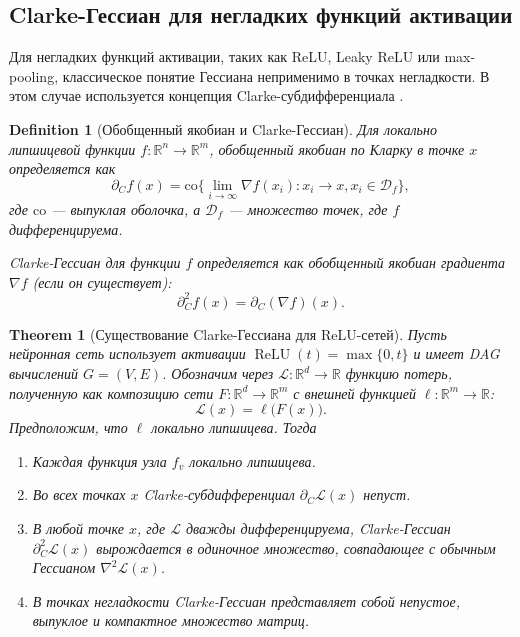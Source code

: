 \documentclass[11pt]{article}
\newtheorem{theorem}{Theorem}
\newtheorem{definition}{Definition}
\begin{document}
\subsection{Clarke-Гессиан для негладких функций активации}

Для негладких функций активации, таких как ReLU, Leaky ReLU или max-pooling, классическое понятие Гессиана
неприменимо в точках негладкости. В этом случае используется концепция Clarke-субдифференциала
\citep{clarke1990optimization}.

\begin{definition}[Обобщенный якобиан и Clarke-Гессиан]
  Для локально липшицевой функции $f: \mathbb{R}^n \to \mathbb{R}^m$, обобщенный якобиан по Кларку в точке
  $x$ определяется как
  \[
    \partial_C f(x) = \mathrm{co}\{\lim_{i\to\infty} \nabla f(x_i) : x_i \to x, x_i \in \mathcal{D}_f\},
  \]
  где $\mathrm{co}$ — выпуклая оболочка, а $\mathcal{D}_f$ — множество точек, где $f$ дифференцируема.

  Clarke-Гессиан для функции $f$ определяется как обобщенный якобиан градиента $\nabla f$ (если он существует):
  \[
    \partial_C^2 f(x) = \partial_C(\nabla f)(x).
  \]
\end{definition}

\begin{theorem}[Существование Clarke-Гессиана для ReLU-сетей]
Пусть нейронная сеть использует активации $\operatorname{ReLU}(t)=\max\{0,t\}$  
и имеет DAG вычислений $G=(V,E)$.  
Обозначим через $\mathcal L:\mathbb R^{d}\to\mathbb R$ функцию потерь,
полученную как композицию сети $F:\mathbb R^{d}\to\mathbb R^{m}$ с вне­шней
функцией $\ell:\mathbb R^{m}\to\mathbb R$:
\[
\mathcal L(x)=\ell\bigl(F(x)\bigr).
\]
Предположим, что $\ell$ локально липшицева. Тогда

\begin{enumerate}
  \item Каждая функция узла $f_v$ локально липшицева.
  \item Во всех точках $x$ Clarke-субдифференциал $\partial_C \mathcal L(x)$ непуст.
  \item В любой точке $x$, где $\mathcal L$ дважды дифференцируема,
        Clarke-Гессиан $\partial^2_C\mathcal L(x)$ вырождается в одиночное множество,
        совпадающее с обычным Гессианом $\nabla^{2}\mathcal L(x)$.
  \item В точках негладкости Clarke-Гессиан представляет собой
        непустое, выпуклое и компактное множество матриц.
\end{enumerate}
\end{theorem}
\end{document}
